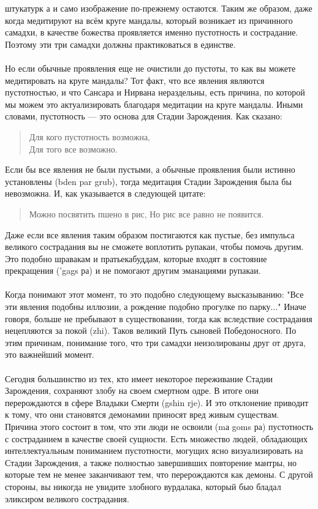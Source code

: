 \begin{siderules}
штукатурк а и само изображение по-прежнему остаются. Таким же образом, даже когда
медитируют на всём круге мандалы, который возникает из причинного самадхи, в качестве
божества проявляется именно пустотность и сострадание. Поэтому эти три самадхи должны
практиковаться в единстве.\\
\\
Но если обычные проявления еще не очистили до пустоты, то как вы можете медитировать
на круге мандалы? Тот факт, что все явления являются пустотностью, и что Сансара и
Нирвана нераздельны, есть причина, по которой мы можем это актуализировать благодаря
медитации на круге мандалы. Иными словами, пустотность — это основа для Стадии Зарождения.
Как сказано:

\begin{verse}
Для кого пустотность возможна,\\
Для того все возможно.
\end{verse}

Если бы все явления не были пустыми, а обычные проявления были истинно установлены
(bden par grub), тогда медитация Стадии Зарождения была бы невозможна. И, как
указывается в следующей цитате:

\begin{verse}
Можно посвятить пшено в рис,
Но рис все равно не появится.
\end{verse}

Даже если все явления таким образом постигаются как пустые, без импульса великого
сострадания вы не сможете воплотить рупакаи, чтобы помочь другим. Это подобно
шравакам и пратьекабуддам, которые входят в состояние прекращения ('gags ра) и не
помогают другим эманациями рупакаи.\\
\\
Когда понимают этот момент, то это подобно следующему высказыванию: "Все эти явления
подобны иллюзии, а рождение подобно прогулке по парку..." Иначе говоря, больше не
пребывают в существовании, тогда как вследствие сострадания нецепляются за покой (zhi).
Таков великий Путь сыновей Победоносного. По этим причинам, понимание того, что три
самадхи неизолированы друг от друга, это важнейший момент.\\
\\
Сегодня большинство из тех, кто имеет некоторое переживание Стадии Зарождения,
сохраняют злобу на своем смертном одре. В итоге они перерождаются в сфере Владыки
Смерти (gshin rje). И это отклонение приводит к тому, что они становятся демонамии
приносят вред живым существам. Причина этого состоит в том, что эти люди не освоили (mа
goms ра) пустотность с состраданием в качестве своей сущности. Есть множество людей,
обладающих интеллектуальным пониманием пустотности, могущих ясно визуализировать на
Стадии Зарождения, а также полностью завершивших повторение мантры, но которые тем не
менее заканчивают тем, что перерождаются как демоны. С другой стороны, вы никогда не
увидите злобного вурдалака, который быо бладал эликсиром великого сострадания.
\end{siderules}

